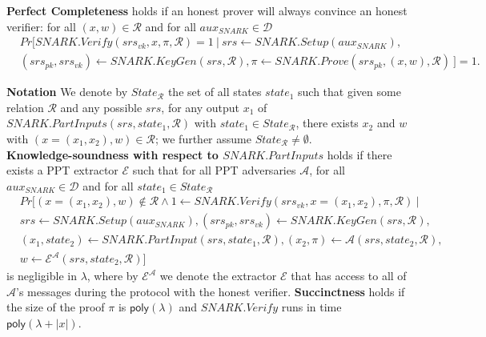 \begin{definition}
\noindent \textbf{Perfect Completeness} holds if an honest prover will always convince an honest verifier: for all  
$(x,w) \in \mathcal{R}$ and for all $\mathit{aux_{\mathit{SNARK}}} \in \mathcal{D}$
\begin{align*}
& \mathit{Pr}[\mathit{SNARK.Verify}(\mathit{srs_{vk}}, x, \pi, \mathcal{R}) = 1 \ | \  
\mathit{srs} \leftarrow \mathit{SNARK.Setup}(\mathit{aux_{\mathit{SNARK}}}), \\ 
& (\mathit{srs_{pk}}, \mathit{srs_{vk}})\leftarrow \mathit{SNARK.KeyGen}(\mathit{srs}, \mathcal{R}), \pi \leftarrow \mathit{SNARK.Prove}(\mathit{srs_{pk}}, (x,w), \mathcal{R}) \ ] = 1.
\end{align*}

\noindent \textbf{Notation} We denote by $\mathit{State_{\mathcal{R}}}$ the set of all states $\mathit{state}_1$ 
such that given some relation $\mathcal{R}$ and any possible $\mathit{srs}$, 
for any output $x_1$ of \\ $\mathit{SNARK.PartInputs}(\mathit{srs}, \mathit{state}_1, \mathcal{R})$ 
with $\mathit{state_1} \in \mathit{State_{\mathcal{R}}}$, there exists $x_2$ and $w$ with $(x=(x_1, x_2), w) \in \mathcal{R}$; 
we further assume $\mathit{State_{\mathcal{R}}} \neq \emptyset$.\\

\noindent \textbf{Knowledge-soundness with respect to $\mathit{SNARK.PartInputs}$}
holds if there exists a PPT extractor $\mathcal{E}$ such that for all PPT 
adversaries $\mathcal{A}$, for all $\mathit{aux_{\mathit{SNARK}}} \in \mathcal{D}$ and for all $\mathit{state_1} \in \mathit{State_{\mathcal{R}}}$
\begin{align*}
&\mathit{Pr}[(x = (x_1, x_2), w) \notin \mathcal{R} \wedge 1 \leftarrow \mathit{SNARK.Verify}(\mathit{srs_{vk}}, x = (x_1, x_2), \pi, \mathcal{R}) \ | \\
&\mathit{srs} \leftarrow \mathit{SNARK.Setup}(\mathit{aux_{\mathit{SNARK}}}), (\mathit{srs_{pk}}, \mathit{srs_{vk}})\leftarrow \mathit{SNARK.KeyGen}(\mathit{srs}, \mathcal{R}), \\ 
& (x_1, \mathit{state}_2) \leftarrow \mathit{SNARK.PartInput}(\mathit{srs}, \mathit{state}_1, \mathcal{R}), (x_2, \pi) \leftarrow \mathcal{A}(\mathit{srs}, \mathit{state}_2, \mathcal{R}), \\
& w \leftarrow \mathcal{E}^{\mathcal{A}}(srs,\mathit{state_2}, \mathcal{R})]
\end{align*}
\noindent is negligible in $\lambda$, where by $\mathcal{E}^{\mathcal{A}}$ we denote the extractor $\mathcal{E}$ that has access to all of 
$\mathcal{A}$'s messages during the protocol with the honest verifier. 
\noindent \textbf{Succinctness} holds if the size of the proof $\pi$ is $\mathsf{poly}(\lambda)$ and $\mathit{SNARK.Verify}$ runs in time 
$\mathsf{poly}(\lambda + |x|)$. %
\end{definition}

